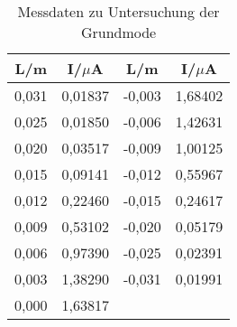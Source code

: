 \begin{table}[h!]
  \centering
  \caption{Messdaten zu Untersuchung der Grundmode}
  \label{tab:grundmode}
  \begin{tabular}{c c c c}
    \toprule
      L/m & I/$\mu$A & L/m & I/$\mu$A \\
      \midrule
       0,031  &  0,01837  &  -0,003  &  1,68402 \\
       0,025  &  0,01850  &  -0,006  &  1,42631 \\
       0,020  &  0,03517  &  -0,009  &  1,00125 \\
       0,015  &  0,09141  &  -0,012  &  0,55967 \\
       0,012  &  0,22460  &  -0,015  &  0,24617 \\
       0,009  &  0,53102  &  -0,020  &  0,05179 \\
       0,006  &  0,97390  &  -0,025  &  0,02391 \\
       0,003  &  1,38290  &  -0,031  &  0,01991 \\
       0,000  &  1,63817  &    & \\
    \bottomrule
  \end{tabular}
\end{table}

%
